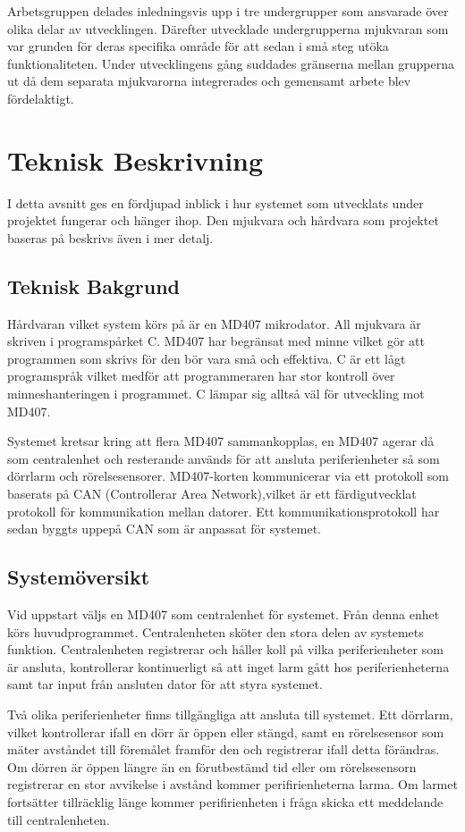\documentclass[a4paper]{article}
\begin{document}
Arbetsgruppen delades inledningsvis upp i tre undergrupper som ansvarade över olika delar av utvecklingen. Därefter utvecklade undergrupperna mjukvaran som var grunden för deras specifika område för att sedan i små steg utöka funktionaliteten. Under utvecklingens gång suddades gränserna mellan grupperna ut då dem separata mjukvarorna integrerades och gemensamt arbete blev fördelaktigt.


\section{Teknisk Beskrivning}
I detta avsnitt ges en fördjupad inblick i hur systemet som utvecklats under projektet fungerar och hänger ihop. Den mjukvara och hårdvara som projektet baseras på beskrivs även i mer detalj.

\subsection{Teknisk Bakgrund}
Hårdvaran vilket system körs på är en MD407 mikrodator. All mjukvara är skriven i programspårket C. MD407 har begränsat med minne vilket gör att programmen som skrivs för den bör vara små och effektiva. C är ett lågt programspråk vilket medför att programmeraren har stor kontroll över minneshanteringen i programmet. C lämpar sig alltså väl för utveckling mot MD407.

Systemet kretsar kring att flera MD407 sammankopplas, en MD407 agerar då som centralenhet och resterande används för att ansluta periferienheter så som dörrlarm och rörelsesensorer. MD407-korten kommunicerar via ett protokoll som baserats på CAN (Controllerar Area Network),vilket är ett färdigutvecklat protokoll för kommunikation mellan datorer. Ett kommunikationsprotokoll har sedan byggts uppepå CAN som är anpassat för systemet.

\subsection{Systemöversikt}

Vid uppstart väljs en MD407 som centralenhet för systemet. Från denna enhet körs huvudprogrammet. Centralenheten sköter den stora delen av systemets funktion. Centralenheten registrerar och håller koll på vilka periferienheter som är ansluta, kontrollerar kontinuerligt så att inget larm gått hos periferienheterna samt tar input från ansluten dator för att styra systemet.

Två olika periferienheter finns tillgängliga att ansluta till systemet. Ett dörrlarm, vilket kontrollerar ifall en dörr är öppen eller stängd, samt en rörelsesensor som mäter avståndet till föremålet framför den och registrerar ifall detta förändras. Om dörren är öppen längre än en förutbestämd tid eller om rörelsesensorn registrerar en stor avvikelse i avstånd kommer perifirienheterna larma. Om larmet fortsätter tillräcklig länge kommer perifirienheten i fråga skicka ett meddelande till centralenheten.
\end{document}
